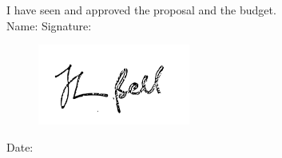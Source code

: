 \documentclass[11pt]{article}
\begin{document}
I have seen and approved the proposal and the budget.\\
\newline
\newline
\newline
\noindent Name:
\newline
\newline
\newline
\newline
\newline
\newline
\noindent Signature:
\begin{figure}
\includegraphics[width=5cm]{signature.png}
\end{figure} 
\newline
\newline
\newline
\newline
\newline
\newline
\noindent Date:


  
\end{document}

